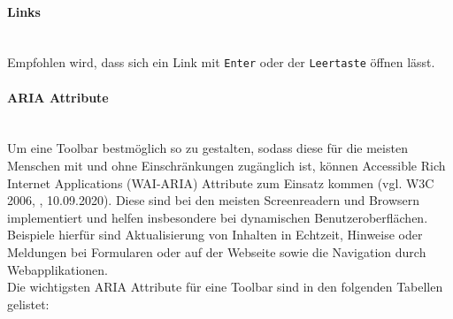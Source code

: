 \paragraph{Links}\mbox{}\\
Empfohlen wird, dass sich ein Link mit \texttt{Enter} oder der  \texttt{Leertaste} öffnen lässt.  

\paragraph{ARIA Attribute}\mbox{}\\
Um eine Toolbar bestmöglich so zu gestalten, sodass diese für die meisten Menschen mit und ohne 
Einschränkungen zugänglich ist, können Accessible Rich Internet Applications (WAI-ARIA) Attribute zum Einsatz kommen (vgl. W3C 2006, \cite{wai_aria_2020}, 10.09.2020).  
Diese sind bei den meisten Screenreadern und Browsern implementiert und helfen insbesondere bei dynamischen 
Benutzeroberflächen. Beispiele hierfür sind Aktualisierung von Inhalten in Echtzeit, Hinweise oder Meldungen  bei 
Formularen oder auf der Webseite sowie die Navigation durch Webapplikationen. \\
Die wichtigsten ARIA Attribute für eine Toolbar sind in den folgenden Tabellen gelistet:

